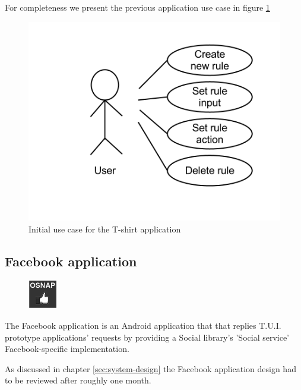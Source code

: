 For completeness we present the previous application use case in figure \ref{fig:design-tshirtappusecase1}

\begin{figure}[H]
	\centering \includegraphics[scale=0.35]{img/design-tshirtappusecase1}
	\caption{Initial use case for the T-shirt application}
	\label{fig:design-tshirtappusecase1}
\end{figure}

\subsection{Facebook application} \label{section:service-fb}
\begin{figure}
	\centering \includegraphics[scale=1]{img/app-fb}
\end{figure}
The Facebook application is an Android application that that replies
T.U.I. prototype applications' requests by providing a Social library's 'Social service'
Facebook-specific implementation.

As discussed in chapter \ref{sec:system-design} the Facebook application design had to be reviewed after roughly one month.

